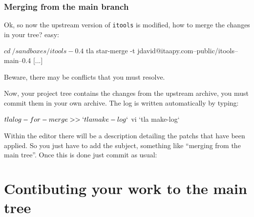 \subsubsection{Merging from the main branch}


Ok, so now the upstream version of {\tt itools} is modified, how to merge
the changes in your tree? easy:

\begin{code}
    $ cd ~/sandboxes/itools-0.4
    $ tla star-merge -t jdavid@itaapy.com--public/itools--main--0.4
    [...]
\end{code}

Beware, there may be conflicts that you must resolve.

Now, your project tree contains the changes from the upstream archive,
you must commit them in your own archive. The log is written automatically
by typing:

\begin{code}
    $ tla log-for-merge >> `tla make-log`
    $ vi `tla make-log`
\end{code}

Within the editor there will be a description detailing the patchs that
have been applied. So you just have to add the subject, something like
``merging from the main tree''. Once this is done just commit as usual:



\section{Contibuting your work to the main tree}